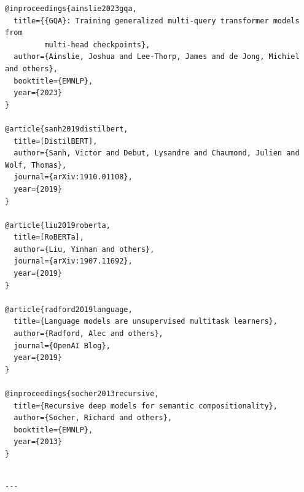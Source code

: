 \begin{lstlisting}
@inproceedings{ainslie2023gqa,
  title={{GQA}: Training generalized multi-query transformer models from 
         multi-head checkpoints},
  author={Ainslie, Joshua and Lee-Thorp, James and de Jong, Michiel and others},
  booktitle={EMNLP},
  year={2023}
}

@article{sanh2019distilbert,
  title=[DistilBERT],
  author={Sanh, Victor and Debut, Lysandre and Chaumond, Julien and Wolf, Thomas},
  journal={arXiv:1910.01108},
  year={2019}
}

@article{liu2019roberta,
  title=[RoBERTa],
  author={Liu, Yinhan and others},
  journal={arXiv:1907.11692},
  year={2019}
}

@article{radford2019language,
  title={Language models are unsupervised multitask learners},
  author={Radford, Alec and others},
  journal={OpenAI Blog},
  year={2019}
}

@inproceedings{socher2013recursive,
  title={Recursive deep models for semantic compositionality},
  author={Socher, Richard and others},
  booktitle={EMNLP},
  year={2013}
}
\end{lstlisting}
\begin{lstlisting}

---
\end{lstlisting}